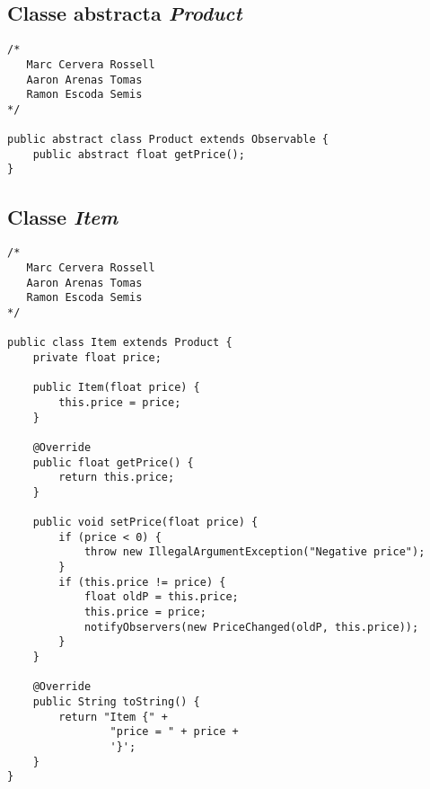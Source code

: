 \documentclass[a4paper,12pt]{article}
\begin{document}
\subsection{Classe abstracta \textit{Product}}

\begin{lstlisting}
/* 
   Marc Cervera Rossell
   Aaron Arenas Tomas
   Ramon Escoda Semis
*/

public abstract class Product extends Observable {
    public abstract float getPrice();
}

\end{lstlisting}
\newpage
\subsection{Classe \textit{Item}}
\begin{lstlisting} 
/* 
   Marc Cervera Rossell
   Aaron Arenas Tomas
   Ramon Escoda Semis
*/

public class Item extends Product {
    private float price;

    public Item(float price) {
        this.price = price;
    }

    @Override
    public float getPrice() {
        return this.price;
    }

    public void setPrice(float price) {
        if (price < 0) {
            throw new IllegalArgumentException("Negative price");
        }
        if (this.price != price) {
            float oldP = this.price;
            this.price = price;
            notifyObservers(new PriceChanged(oldP, this.price));
        }
    }

    @Override
    public String toString() {
        return "Item {" +
                "price = " + price +
                '}';
    }
}
\end{lstlisting}
\newpage
\end{document}
